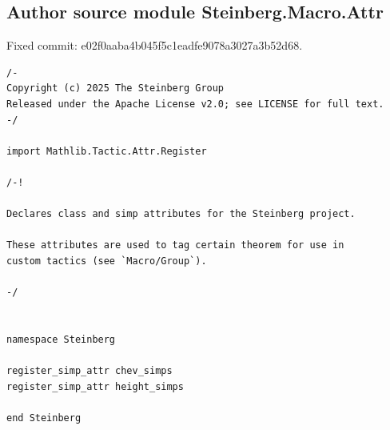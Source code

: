 \subsection*{Author source module Steinberg.Macro.Attr}
\noindent Fixed commit: e02f0aaba4b045f5c1eadfe9078a3027a3b52d68.
\begin{Verbatim}
/-
Copyright (c) 2025 The Steinberg Group
Released under the Apache License v2.0; see LICENSE for full text.
-/

import Mathlib.Tactic.Attr.Register

/-!

Declares class and simp attributes for the Steinberg project.

These attributes are used to tag certain theorem for use in
custom tactics (see `Macro/Group`).

-/


namespace Steinberg

register_simp_attr chev_simps
register_simp_attr height_simps

end Steinberg
\end{Verbatim}
